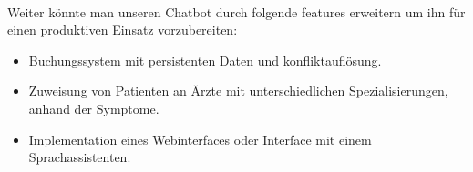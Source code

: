 \documentclass[11pt,a4paper]{article}
\begin{document}
        \paragraph{}
            Weiter könnte man unseren Chatbot durch folgende features erweitern um ihn für einen produktiven Einsatz vorzubereiten:
            \begin{itemize}
                \item Buchungssystem mit persistenten Daten und konfliktauflösung.
                \item Zuweisung von Patienten an Ärzte mit unterschiedlichen Spezialisierungen, anhand der Symptome.
                \item Implementation eines Webinterfaces oder Interface mit einem Sprachassistenten. 
            \end{itemize}
\end{document}
